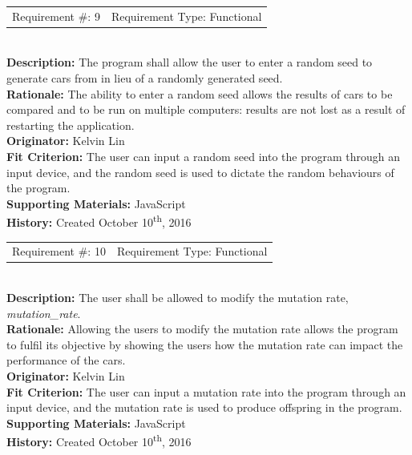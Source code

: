 \documentclass[12pt, titlepage]{article}
\begin{document}
\begin{reqbox}
	\begin{tabular}{cc}
		Requirement \#: 9 & Requirement Type: Functional \\
	\end{tabular} \\
	\textbf{Description:} The program shall allow the user to enter a random seed 
to 
	generate cars from in lieu of a randomly generated seed. \\
	\textbf{Rationale:} The ability to enter a random seed allows the results of 
	cars to be compared and to be run on multiple computers: results are not lost 
as 
	a result of restarting the application. \\
	\textbf{Originator:} Kelvin Lin\\
	\textbf{Fit Criterion:} The user can input a random seed into the program 
	through an input device, and the random seed is used to dictate the random 
	behaviours of the program.\\
	\textbf{Supporting Materials:} JavaScript \\
	\textbf{History:} Created October 10\textsuperscript{th}, 2016
\end{reqbox}

\newpage

\begin{reqbox}
	\begin{tabular}{cc}
		Requirement \#: 10 & Requirement Type: Functional \\
	\end{tabular} \\
	\textbf{Description:} The user shall be allowed to modify the mutation rate, 
	\textit{mutation\_rate}. \\
	\textbf{Rationale:} Allowing the users to modify the mutation rate allows the 
	program to fulfil its objective by showing the users how the mutation rate can 
	impact the performance of the cars. \\
	\textbf{Originator:} Kelvin Lin\\
	\textbf{Fit Criterion:} The user can input a mutation rate into the program 
	through an input device, and the mutation rate is used to produce offspring in 
	the program.\\
	\textbf{Supporting Materials:} JavaScript \\
	\textbf{History:} Created October 10\textsuperscript{th}, 2016
\end{reqbox}
\end{document}
